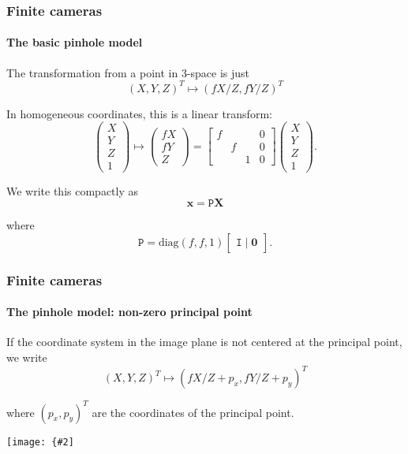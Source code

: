 \documentclass[aspectratio=169]{beamer}
\renewcommand{\vec}[1]{\boldsymbol{#1}}
\newcommand{\mat}[1]{\mathtt{#1}}
\newcommand{\myfig}[3]{\centerline{\texttt{[image: \{\#2]}}}
    \centerline{\scriptsize #3}}
\begin{document}
\begin{frame}
\frametitle{Finite cameras}
\framesubtitle{The basic pinhole model}

The transformation from a point in 3-space is just
\begin{equation*}
(X,Y,Z)^T \mapsto (fX/Z,fY/Z)^T
\end{equation*}

\medskip

In homogeneous coordinates, this is a linear transform:
\begin{equation*}
\begin{pmatrix} X \\ Y \\ Z \\ 1 \end{pmatrix} \mapsto
\begin{pmatrix} fX \\ fY \\ Z \end{pmatrix} =
\begin{bmatrix} f & & & 0 \\ & f & & 0 \\ & & 1 & 0 \end{bmatrix}
\begin{pmatrix} X \\ Y \\ Z \\ 1 \end{pmatrix}.
\end{equation*}

\medskip

We write this compactly as
\begin{equation*}
\vec{x}=\mat{P}\vec{X}
\end{equation*}

\medskip

where
\begin{equation*}
\mat{P} = \text{diag}(f,f,1)
\begin{bmatrix} \mat{I} \mid \vec{0} \end{bmatrix}.
\end{equation*}

\end{frame}

\begin{frame}
\frametitle{Finite cameras}
\framesubtitle{The pinhole model: non-zero principal point}

If the coordinate system in the image plane is not centered at the
principal point, we write
\begin{equation*}
(X,Y,Z)^T \mapsto (fX/Z+p_x,fY/Z+p_y)^T
\end{equation*}

where $(p_x,p_y)^T$ are the coordinates of the principal point.

\medskip

\myfig{2in}{HZ-fig5-2}{Hartley and Zisserman (2004), Fig.\ 6.2}

\end{frame}
\end{document}
